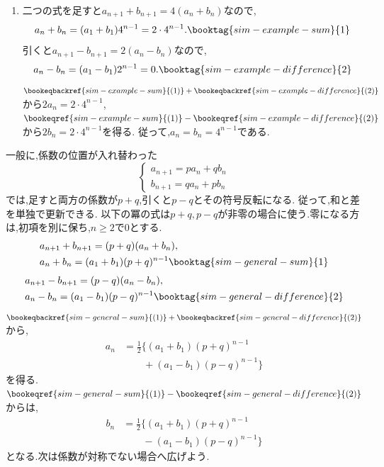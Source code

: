 \noindent {}\par\nobreak
\begin{enumerate}[label=(\arabic*),parsep=3pt,format=\bookitemlink{example-system-1}{solution}{problem}]
  \item 二つの式を足すと$a_{n+1}+b_{n+1}=4(a_n+b_n)$なので,
    \[
      a_n+b_n=(a_1+b_1)4^{n-1}=2\cdot4^{n-1}.
      \booktag{sim-example-sum}{1}
    \]
    引くと$a_{n+1}-b_{n+1}=2(a_n-b_n)$なので,
    \[
      a_n-b_n=(a_1-b_1)2^{n-1}=0.
      \booktag{sim-example-difference}{2}
    \]
    $\bookeqbackref{sim-example-sum}{(1)}+\bookeqbackref{sim-example-difference}{(2)}$から$2a_n=2\cdot4^{n-1}$,
    $\bookeqref{sim-example-sum}{(1)}-\bookeqref{sim-example-difference}{(2)}$から$2b_n=2\cdot4^{n-1}$を得る.
    従って,$a_n=b_n=4^{n-1}$である.
\end{enumerate}

一般に,係数の位置が入れ替わった
\[
  \begin{cases}
    a_{n+1}=pa_n+qb_n\\
    b_{n+1}=qa_n+pb_n
  \end{cases}
\]
では,足すと両方の係数が$p+q$,引くと$p-q$とその符号反転になる.
従って,和と差を単独で更新できる.
以下の冪の式は$p+q,p-q$が非零の場合に使う.零になる方は,初項を別に保ち,$n\ge2$で$0$とする.
\begin{align*}
  &a_{n+1}+b_{n+1}=(p+q)(a_n+b_n),\\
  &a_n+b_n=(a_1+b_1)(p+q)^{n-1}
  \booktag{sim-general-sum}{1}
\end{align*}
\begin{align*}
  &a_{n+1}-b_{n+1}=(p-q)(a_n-b_n),\\
  &a_n-b_n=(a_1-b_1)(p-q)^{n-1}
  \booktag{sim-general-difference}{2}
\end{align*}
$\bookeqbackref{sim-general-sum}{(1)}+\bookeqbackref{sim-general-difference}{(2)}$から,
\[
  \begin{aligned}
    a_n&=\frac12\bigl\{(a_1+b_1)(p+q)^{n-1}\\
    &\qquad+(a_1-b_1)(p-q)^{n-1}\bigr\}
  \end{aligned}
\]
を得る.$\bookeqref{sim-general-sum}{(1)}-\bookeqref{sim-general-difference}{(2)}$からは,
\[
  \begin{aligned}
    b_n&=\frac12\bigl\{(a_1+b_1)(p+q)^{n-1}\\
    &\qquad-(a_1-b_1)(p-q)^{n-1}\bigr\}
  \end{aligned}
\]
となる.次は係数が対称でない場合へ広げよう.

